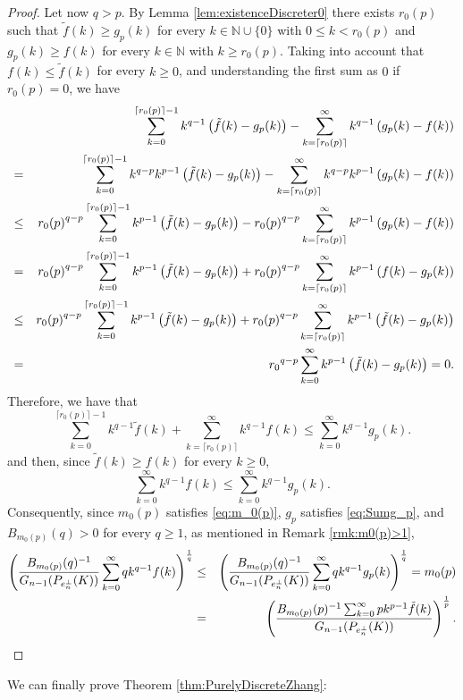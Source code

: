 \documentclass[10pt]{amsart}
\def\N{\mathbb{N}}
\numberwithin{equation}{section}
\begin{document}
\begin{proof}
Let now $q>p$. By Lemma \ref{lem:existenceDiscreter0} there exists $r_0(p)$ such that $\tilde{f}(k)\geq g_p(k)$
for every $k\in\N\cup\{0\}$ with $0\leq k< r_0(p)$ and $g_p(k)\geq f(k)$
for every $k\in\N$ with $k\geq r_0(p)$. Taking into account that $f(k)\leq\tilde{f}(k)$ for every $k\geq0$, and understanding the first sum as $0$ if $r_0(p)=0$, we have
\begin{eqnarray*}
&&\sum_{k=0}^{\lceil r_0(p)\rceil-1}k^{q-1}\left(\tilde{f}(k)-g_p(k)\right)-\sum_{k=\lceil r_0(p)\rceil}^\infty k^{q-1}\left(g_p(k)-f(k)\right)\cr
&=&\sum_{k=0}^{\lceil r_0(p)\rceil-1}k^{q-p}k^{p-1}\left(\tilde{f}(k)-g_p(k)\right)-\sum_{k=\lceil r_0(p)\rceil}^\infty k^{q-p}k^{p-1}\left(g_p(k)-f(k)\right)\cr
&\leq&{r_0(p)}^{q-p}\sum_{k=0}^{\lceil r_0(p)\rceil-1}k^{p-1}\left(\tilde{f}(k)-g_p(k)\right)-{r_0(p)}^{q-p}\sum_{k=\lceil r_0(p)\rceil}^\infty k^{p-1}\left(g_p(k)-f(k)\right)\cr
&=&{r_0(p)}^{q-p}\sum_{k=0}^{\lceil r_0(p)\rceil-1}k^{p-1}\left(\tilde{f}(k)-g_p(k)\right)+{r_0(p)}^{q-p}\sum_{k=\lceil r_0(p)\rceil}^\infty k^{p-1}\left(f(k)-g_p(k)\right)\cr
&\leq&{r_0(p)}^{q-p}\sum_{k=0}^{\lceil r_0(p)\rceil-1}k^{p-1}\left(\tilde{f}(k)-g_p(k)\right)+{r_0(p)}^{q-p}\sum_{k=\lceil r_0(p)\rceil}^\infty k^{p-1}\left(\tilde{f}(k)-g_p(k)\right)\cr
&=&{r_0}^{q-p}\sum_{k=0}^{\infty}k^{p-1}\left(\tilde{f}(k)-g_p(k)\right)=0.
\end{eqnarray*}
Therefore, we have that
$$
\sum_{k=0}^{\lceil r_0(p)\rceil-1}k^{q-1}\tilde{f}(k)+\sum_{k=\lceil r_0(p)\rceil}^\infty k^{q-1}f(k)\leq\sum_{k=0}^\infty k^{q-1}g_p(k).
$$
and then, since $\tilde{f}(k)\geq f(k)$ for every $k\geq0$,
$$
\sum_{k=0}^{\infty}k^{q-1}f(k)\leq\sum_{k=0}^\infty k^{q-1}g_p(k).
$$
Consequently, since $m_0(p)$  satisfies \eqref{eq:m_0(p)}, $g_p$ satisfies \eqref{eq:Sumg_p}, and $B_{m_0(p)}(q)>0$ for every $q\geq 1$, as mentioned in Remark \ref{rmk:m0(p)>1},
\begin{eqnarray*}
\left(\frac{B_{m_0(p)}(q)^{-1}}{G_{n-1}(P_{e_n^\perp}(K))}\sum_{k=0}^{\infty}qk^{q-1}f(k)\right)^\frac{1}{q}&\leq&\left(\frac{B_{m_0(p)}(q)^{-1}}{G_{n-1}(P_{e_n^\perp}(K))}\sum_{k=0}^{\infty}qk^{q-1}g_p(k)\right)^\frac{1}{q}=m_0(p)\cr
&=&\left(\frac{B_{m_0(p)}(p)^{-1}\sum_{k=0}^\infty pk^{p-1}\tilde{f}(k)}{G_{n-1}(P_{e_n^\perp}(K))}\right)^\frac{1}{p}.\cr
\end{eqnarray*}
\end{proof}

We can finally prove Theorem \ref{thm:PurelyDiscreteZhang}:
\end{document}
